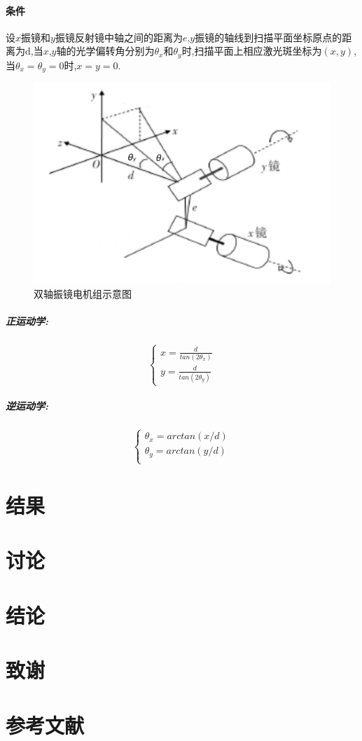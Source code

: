 \documentclass[a4paper,12pt,onecolumn,twoside]{article}
\begin{document}
\paragraph{条件}
设$x$振镜和$y$振镜反射镜中轴之间的距离为$e$,$y$振镜的轴线到扫描平面坐标原点的距离为d,当$x$,$y$轴的光学偏转角分别为$\theta_x$和$\theta_y$时,扫描平面上相应激光斑坐标为$(x,y)$,当$\theta_x=\theta_y=0$时,$x=y=0$.
\begin{figure}[htbp]
\includegraphics[width=\linewidth]{MG6.png}
\caption{双轴振镜电机组示意图}
\end{figure}
\subparagraph{正运动学:}
\begin{equation}
\left\{
\begin{array}{c}
x=\frac{d}{tan(2\theta_x)} \\
y=\frac{d}{tan(2\theta_y)} 
\end{array}
\right.
\end{equation}
\subparagraph{逆运动学:}
\begin{equation}
\left\{
\begin{array}{c}
\theta_x = arctan(x/d)  \\
\theta_y =  arctan(y/d) \\
\end{array}
\right.
\end{equation}

\newpage
\section{结果}

\newpage
\section{讨论}

\newpage
\section{结论}

\newpage
\section{致谢}

\newpage
\section{参考文献}
\end{document}
